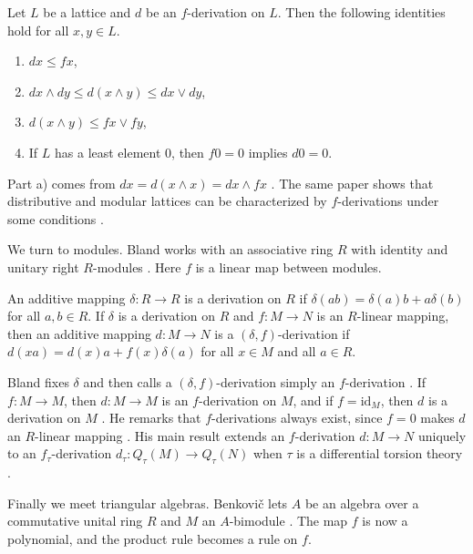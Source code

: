 \begin{proposition}\label{prop:f:lattice-first}
Let $L$ be a lattice and $d$ be an $f$-derivation on $L$. Then the following identities
hold for all $x,y\in L$.
\begin{enumerate}
\item[a)] $dx\le fx$,
\item[b)] $dx\wedge dy\le d(x\wedge y)\le dx\vee dy$,
\item[c)] $d(x\wedge y)\le fx\vee fy$,
\item[d)] If $L$ has a least element $0$, then $f0=0$ implies $d0=0$.
\end{enumerate}
\end{proposition}

Part a) comes from $dx=d(x\wedge x)=dx\wedge fx$ \cite[p.~703]{CevenOzturk2008}. The same
paper shows that distributive and modular lattices can be characterized by
$f$-derivations under some conditions \cite[p.~701]{CevenOzturk2008}.

We turn to modules. Bland works with an associative ring $R$ with identity and unitary
right $R$-modules \cite[p.~379]{Bland2006}. Here $f$ is a linear map between modules.

\begin{definition}\label{def:f:module}
An additive mapping $\delta:R\to R$ is a derivation on $R$ if
$\delta(ab)=\delta(a)b+a\delta(b)$ for all $a,b\in R$. If $\delta$ is a derivation on
$R$ and $f:M\to N$ is an $R$-linear mapping, then an additive mapping $d:M\to N$ is a
$(\delta,f)$-derivation if $d(xa)=d(x)a+f(x)\delta(a)$ for all $x\in M$ and all
$a\in R$.
\end{definition}

Bland fixes $\delta$ and then calls a $(\delta,f)$-derivation simply an $f$-derivation
\cite[p.~379]{Bland2006}. If $f:M\to M$, then $d:M\to M$ is an $f$-derivation on $M$,
and if $f=\mathrm{id}_M$, then $d$ is a derivation on $M$ \cite[p.~379]{Bland2006}.
He remarks that $f$-derivations always exist, since $f=0$ makes $d$ an $R$-linear
mapping \cite[p.~379]{Bland2006}. His main result extends an $f$-derivation
$d:M\to N$ uniquely to an $f_\tau$-derivation $d_\tau:Q_\tau(M)\to Q_\tau(N)$ when
$\tau$ is a differential torsion theory \cite[p.~380]{Bland2006}.

Finally we meet triangular algebras. Benkovič lets $A$ be an algebra over a commutative
unital ring $R$ and $M$ an $A$-bimodule \cite[Section~1]{Benkovic2014}. The map $f$ is
now a polynomial, and the product rule becomes a rule on $f$.

